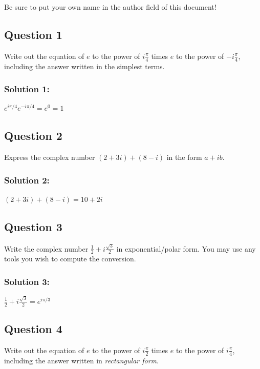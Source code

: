 \documentclass{article}
\begin{document}
Be sure to put your own name in the author field of this document!


\subsection*{Question 1}

Write out the equation of $e$ to the power of $i\frac{\pi}{4}$ times $e$ to the power of $-i\frac{\pi}{4}$, including the answer written in the simplest terms.

\subsubsection*{Solution 1:}

$e^{i\pi/4}e^{-i\pi/4}=e^0=1$

\subsection*{Question 2}

Express the complex number $(2+3i) + (8-i)$ in the form $a+ib$.

\subsubsection*{Solution 2:}

$(2+3i)+(8-i)=10+2i$

\subsection*{Question 3}

Write the complex number $\frac{1}{2} + i \frac{\sqrt{3}}{2}$ in exponential/polar form. You may use any tools you wish to compute the conversion.

\subsubsection*{Solution 3:}

$\frac12+i\frac{\sqrt3}{2}=e^{i\pi/3}$

\subsection*{Question 4}

Write out the equation of $e$ to the power of $i\frac{\pi}{2}$ times $e$ to the power of $i\frac{\pi}{4}$, including the answer written in \textit{rectangular form}.
\end{document}
